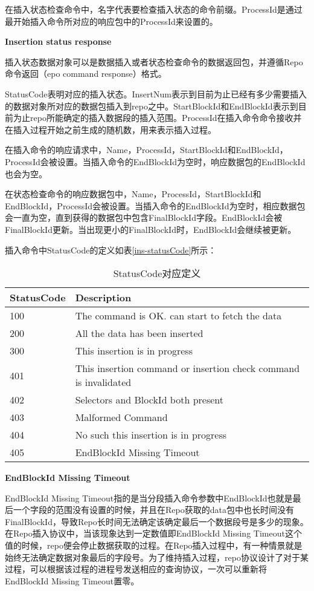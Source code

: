 在插入状态检查命令中，名字代表要检查插入状态的命令前缀。ProcessId是通过最开始插入命令所对应的响应包中的ProcessId来设置的。

\textbf{Insertion status response}

插入状态数据对象可以是数据插入或者状态检查命令的数据返回包，并遵循Repo命令返回（epo command response）格式。

StatusCode表明对应的插入状态。InsertNum表示到目前为止已经有多少需要插入的数据对象所对应的数据包插入到repo之中。StartBlockId和EndBlockId表示到目前为止repo所能确定的插入数据段的插入范围。ProcessId在插入命令命令接收并在插入过程开始之前生成的随机数，用来表示插入过程。

在插入命令的响应请求中，Name，ProcessId，StartBlockId和EndBlockId，ProcessId会被设置。当插入命令的EndBlockId为空时，响应数据包的EndBlockId也会为空。

在状态检查命令的响应数据包中，Name，ProcessId，StartBlockId和EndBlockId，ProcessId会被设置。当插入命令的EndBlockId为空时，相应数据包会一直为空，直到获得的数据包中包含FinalBlockId字段。EndBlockId会被FinalBlockId更新。当出现更小的FinalBlockId时，EndBlockId会继续被更新。

插入命令中StatusCode的定义如表\ref{ins-statusCode}所示：

\begin{table}[h]
\centering
\caption{StatusCode对应定义}
\label{tab:ins-statusCode}
\begin{tabular}{|l|l|}
\hline
\textbf{StatusCode} & \textbf{Description} \\ \hline
100 & The command is OK. can start to fetch the data \\ \hline
200 & All the data has been inserted \\ \hline
300 & This insertion is in progress \\ \hline
401 & This insertion command or insertion check command is invalidated \\ \hline
402 & Selectors and BlockId both present \\ \hline
403 & Malformed Command \\ \hline
404 & No such this insertion is in progress \\ \hline
405 & EndBlockId Missing Timeout \\ \hline
\end{tabular}
\end{table}

\textbf{EndBlockId Missing Timeout}

EndBlockId Missing Timeout指的是当分段插入命令参数中EndBlockId也就是最后一个字段的范围没有设置的时候，并且在Repo获取的data包中也长时间没有FinalBlockId，导致Repo长时间无法确定该确定最后一个数据段号是多少的现象。在Repo插入协议中，当该现象达到一定数值即EndBlockId Missing Timeout这个值的时候，repo便会停止数据获取的过程。在Repo插入过程中，有一种情景就是始终无法确定数据对象最后的字段号。为了维持插入过程，repo协议设计了对于某过程，可以根据该过程的进程号发送相应的查询协议，一次可以重新将EndBlockId Missing Timeout置零。

